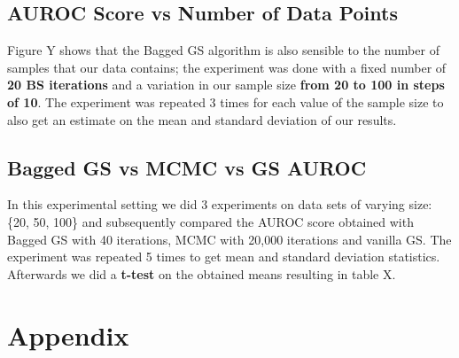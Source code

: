\documentclass{article}
\begin{document}
	\subsection{AUROC Score vs Number of Data Points}
	Figure Y shows that the Bagged GS algorithm is also sensible to the number of
	samples that our data contains; the experiment was done with a fixed number
	of \textbf{20 BS iterations} and a variation in our sample size \textbf{from 20 to 100 in
	steps of 10}. The experiment was repeated 3 times for each value of the sample
	size to also get an estimate on the mean and standard deviation of our
	results.

	\subsection{Bagged GS vs MCMC vs GS AUROC}
	In this experimental setting we did 3 experiments on data sets of varying
	size: \{20, 50, 100\} and subsequently compared the AUROC score obtained with
	Bagged GS with 40 iterations, MCMC with 20,000 iterations and vanilla GS. The
	experiment was repeated 5 times to get mean and standard deviation
	statistics. Afterwards we did a \textbf{t-test} on the obtained means resulting in
	table X. 

	\section*{Appendix}
\end{document}
